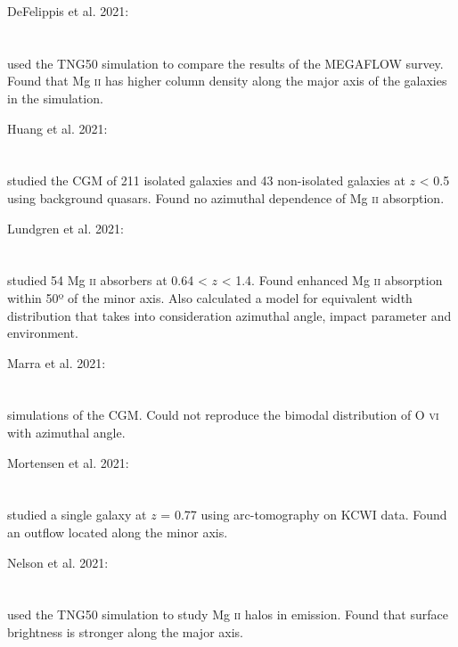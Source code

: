 \hline

DeFelippis et al. 2021: \\
\citet{2021arXiv210208383D} \\
\citep{2021arXiv210208383D} \\
used the TNG50 simulation to compare the results of the MEGAFLOW survey. Found
that Mg \textsc{ii} has higher column density along the major axis of the
galaxies in the simulation. \\

\hline

Huang et al. 2021: \\
\citet{2021MNRAS.502.4743H} \\
\citep{2021MNRAS.502.4743H} \\
studied the CGM of 211 isolated galaxies and 43 non-isolated galaxies at
$z$ < 0.5 using background quasars. Found no azimuthal dependence of
Mg \textsc{ii} absorption. \\

\hline

Lundgren et al. 2021: \\
\citet{2021ApJ...913...50L} \\
\citep{2021ApJ...913...50L} \\
studied 54 Mg \textsc{ii} absorbers at 0.64 < $z$ < 1.4. Found enhanced
Mg \textsc{ii} absorption within 50º of the minor axis. Also calculated a model
for equivalent width distribution that takes into consideration azimuthal angle,
impact parameter and environment.

\hline

Marra et al. 2021: \\
\citet{2021ApJ...907....8M} \\
\citep{2021ApJ...907....8M} \\
simulations of the CGM. Could not reproduce the bimodal distribution of
O \textsc{vi} with azimuthal angle. \\

\hline

Mortensen et al. 2021: \\
\citet{2021ApJ...914...92M} \\
\citep{2021ApJ...914...92M} \\
studied a single galaxy at $z$ = 0.77 using arc-tomography on KCWI data. Found
an outflow located along the minor axis. \\

\hline

Nelson et al. 2021: \\
\citet{2021MNRAS.507.4445N} \\
\citep{2021MNRAS.507.4445N} \\
used the TNG50 simulation to study Mg \textsc{ii} halos in emission. Found that
surface brightness is stronger along the major axis. \\

